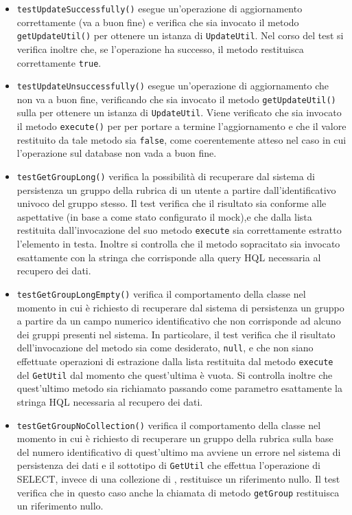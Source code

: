\begin{itemize}
\begin{itemize}
\item \texttt{testUpdateSuccessfully()} esegue un'operazione di aggiornamento correttamente (va a buon fine) e verifica che sia invocato il metodo \texttt{getUpdateUtil()} per ottenere un istanza di \texttt{UpdateUtil}. Nel corso del test si verifica inoltre che, se l'operazione ha successo, il metodo restituisca correttamente \texttt{true}.

\item \texttt{testUpdateUnsuccessfully()} esegue un'operazione di aggiornamento che non va a buon fine, verificando che sia invocato il metodo \texttt{getUpdateUtil()} sulla  per ottenere un istanza di \texttt{UpdateUtil}. Viene verificato che sia invocato il metodo \texttt{execute()} per per portare a termine l'aggiornamento e che il valore restituito da tale metodo sia \texttt{false}, come coerentemente atteso nel caso in cui l'operazione sul database non vada a buon fine.

\item \texttt{testGetGroupLong()} verifica la possibilità di recuperare dal sistema di persistenza un gruppo della rubrica di un utente a partire dall'identificativo univoco del gruppo stesso. Il test verifica che il risultato sia conforme alle aspettative (in base a come stato configurato il mock),e che dalla lista restituita dall'invocazione del suo metodo \texttt{execute} sia correttamente estratto l'elemento in testa. Inoltre si controlla che il metodo sopracitato sia invocato esattamente con la stringa che corrisponde alla query HQL necessaria al recupero dei dati. 

\item \texttt{testGetGroupLongEmpty()} verifica il comportamento della classe nel momento in cui è richiesto di recuperare dal sistema di persistenza un gruppo a partire da un campo numerico identificativo che non corrisponde ad alcuno dei gruppi presenti nel sistema. In particolare, il test verifica che il risultato dell'invocazione del metodo sia come desiderato, \texttt{null}, e che non siano effettuate operazioni di estrazione dalla lista restituita dal metodo \texttt{execute} del \texttt{GetUtil} dal momento che quest'ultima è vuota. Si controlla inoltre che quest'ultimo metodo sia richiamato passando come parametro esattamente la stringa HQL necessaria al recupero dei dati.

\item \texttt{testGetGroupNoCollection()} verifica il comportamento della classe nel momento in cui è richiesto di recuperare un gruppo della rubrica sulla base del numero identificativo di quest'ultimo ma avviene un errore nel sistema di persistenza dei dati e il sottotipo di \texttt{GetUtil} che effettua l'operazione di SELECT, invece di una collezione di , restituisce un riferimento nullo. Il test verifica che in questo caso anche la chiamata di metodo \texttt{getGroup} restituisca un riferimento nullo.


\end{itemize}
\end{itemize}
